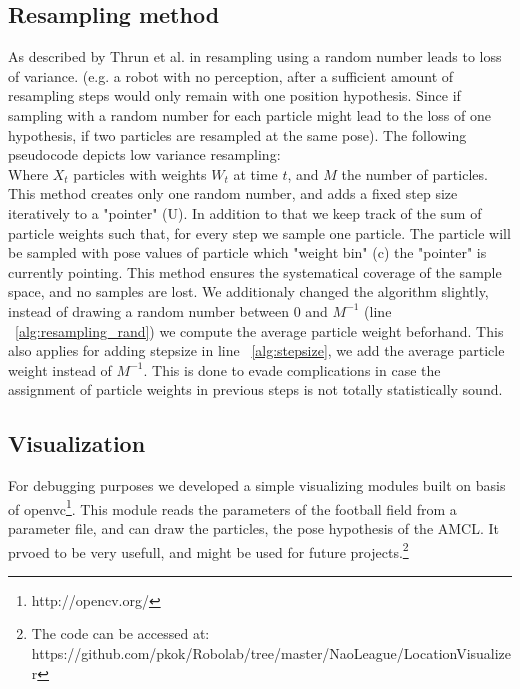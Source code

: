 \documentclass[	DIV=calc,%
							paper=a4,%
							fontsize=9pt,%
							twocolumn]{scrartcl}	 					%
\begin{document}
\subsection{Resampling method}
As described by Thrun et al. in \cite{ProbabilisticRobotsics} resampling using a random number leads to loss of variance. (e.g. a robot with no perception, after a sufficient amount of resampling steps would only remain with one position hypothesis. Since if sampling with a random number for each particle might lead to the loss of one hypothesis, if two particles are resampled at the same pose).
The following pseudocode depicts low variance resampling:\\
Where $X_t$ particles with weights $W_t$ at time $t$, and $M$ the number of particles.
This method creates only one random number, and adds a fixed step size iteratively to a "pointer" (U).
In addition to that we keep track of the sum of particle weights such that, for every step we sample one particle. The particle will be sampled with pose values of particle which "weight bin" (c) the "pointer" is currently pointing. 
This method ensures the systematical coverage of the sample space, and no samples are lost.
We additionaly changed the algorithm slightly, instead of drawing a random number between 0 and $M^{-1}$ (line ~\ref{alg:resampling_rand}) we compute the average particle weight beforhand. This also applies for adding stepsize in line ~\ref{alg:stepsize}, we add the average particle weight instead of $M^{-1}$. This is done to evade complications in case the assignment of particle weights in previous steps is not totally statistically sound.

\subsection{Visualization}
For debugging purposes we developed a simple visualizing modules built on basis of openvc\footnote{http://opencv.org/}. This module reads the parameters of the football field from a parameter file, and can draw the particles, the pose hypothesis of the AMCL. It prvoed to be very usefull, and might be used for future projects.\footnote{The code can be accessed at: https://github.com/pkok/Robolab/tree/master/NaoLeague/LocationVisualizer}
\end{document}
